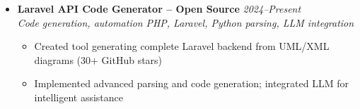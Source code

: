 \documentclass[a4paper,11pt]{article}
\begin{document}
\begin{itemize}[leftmargin=*, label={-}]
\item \textbf{Laravel API Code Generator -- Open Source} \hfill \textit{2024--Present} \\
\textit{Code generation, automation} \hfill \textit{PHP, Laravel, Python parsing, LLM integration}
\vspace{-2pt}
    \begin{itemize}[leftmargin=0.4cm, nosep, label=\tiny$\bullet$]
        \item \small{Created tool generating complete Laravel backend from UML/XML diagrams (30+ GitHub stars)}
        \item \small{Implemented advanced parsing and code generation; integrated LLM for intelligent assistance}
    \end{itemize}
\vspace{3pt}

\end{itemize}
\end{document}
